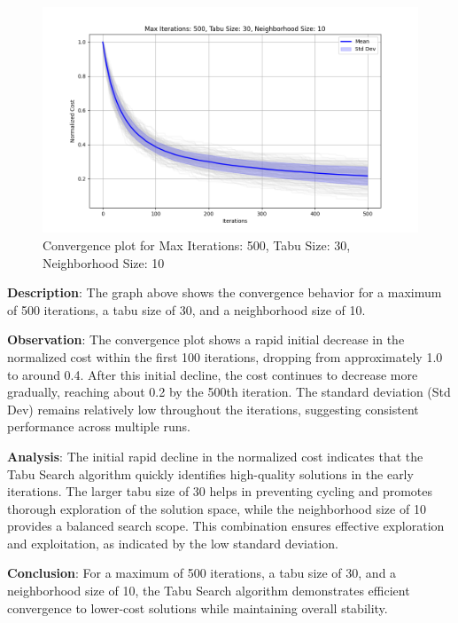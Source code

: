 \documentclass{article}
\begin{document}
    \begin{figure}[H]
        \centering
        \includegraphics[width=\textwidth]{tabu_search/max_iter_500_tabu_size_30_neighborhood_size_10}
        \caption{Convergence plot for Max Iterations: 500, Tabu Size: 30, Neighborhood Size: 10}
        \label{fig:ts_500_30_10}
    \end{figure}

    \textbf{Description}: The graph above shows the convergence behavior for a maximum of 500 iterations, a tabu size of 30, and a neighborhood size of 10.

    \textbf{Observation}: The convergence plot shows a rapid initial decrease in the normalized cost within the first 100 iterations, dropping from approximately 1.0 to around 0.4. After this initial decline, the cost continues to decrease more gradually, reaching about 0.2 by the 500th iteration. The standard deviation (Std Dev) remains relatively low throughout the iterations, suggesting consistent performance across multiple runs.

    \textbf{Analysis}: The initial rapid decline in the normalized cost indicates that the Tabu Search algorithm quickly identifies high-quality solutions in the early iterations. The larger tabu size of 30 helps in preventing cycling and promotes thorough exploration of the solution space, while the neighborhood size of 10 provides a balanced search scope. This combination ensures effective exploration and exploitation, as indicated by the low standard deviation.

    \textbf{Conclusion}: For a maximum of 500 iterations, a tabu size of 30, and a neighborhood size of 10, the Tabu Search algorithm demonstrates efficient convergence to lower-cost solutions while maintaining overall stability.
\end{document}
